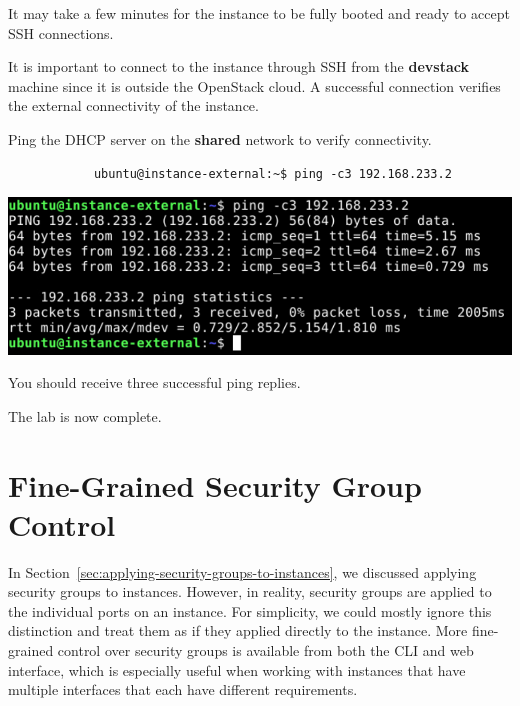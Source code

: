 \documentclass[letterpaper, 12pt]{article}
\begin{document}
\begin{enumerate}
    \begin{notebox}
        It may take a few minutes for the instance to be fully booted and ready to accept SSH connections.
    \end{notebox}
    \begin{notebox}
        It is important to connect to the instance through SSH from the \textbf{devstack} machine since it is outside the OpenStack cloud.
        A successful connection verifies the external connectivity of the instance.
    \end{notebox}

    \begin{labstep}
        Ping the DHCP server on the \textbf{shared} network to verify connectivity.
        \begin{lstlisting}
            ubuntu@instance-external:~$ ping -c3 192.168.233.2
        \end{lstlisting}

        \begin{center}
            \includegraphics[width=\linewidth]{images/part5/step42.png}
        \end{center}
    \end{labstep}

    \begin{notebox}
        You should receive three successful ping replies.
    \end{notebox}

    \begin{labstep}
        The lab is now complete.
    \end{labstep}

\end{enumerate}

\appendix
\section{Fine-Grained Security Group Control}
In Section~\ref{sec:applying-security-groups-to-instances}, we discussed applying security groups to instances.
However, in reality, security groups are applied to the individual ports on an instance.
For simplicity, we could mostly ignore this distinction and treat them as if they applied directly to the instance.
More fine-grained control over security groups is available from both the CLI and web interface, which is especially useful when working with instances that have multiple interfaces that each have different requirements.
\end{document}

